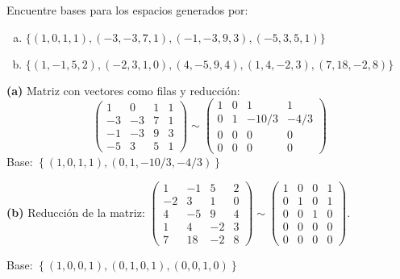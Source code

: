 \begin{prob} Encuentre bases para los espacios generados por:
\begin{enumerate}[(a)]
\item $\{ (1,0,1,1), (-3,-3,7,1), (-1,-3,9,3), (-5,3,5,1) \}$
\item $\{ (1,-1,5,2), (-2,3,1,0), (4,-5,9,4), (1,4,-2,3), (7,18,-2,8) \}$
\end{enumerate}

\begin{myproof}
\textbf{(a)} Matriz con vectores como filas y reducción:
$$\begin{pmatrix} 1 & 0 & 1 & 1 \\ -3 & -3 & 7 & 1 \\ -1 & -3 & 9 & 3 \\ -5 & 3 & 5 & 1 \end{pmatrix} \sim \begin{pmatrix} 1 & 0 & 1 & 1 \\ 0 & 1 & -10/3 & -4/3 \\ 0 & 0 & 0 & 0 \\ 0 & 0 & 0 & 0 \end{pmatrix}$$
Base: $\left\{ (1,0,1,1), (0,1,-10/3,-4/3) \right\}$

\textbf{(b)} Reducción de la matriz: $\begin{pmatrix} 1 & -1 & 5 & 2 \\ -2 & 3 & 1 & 0 \\ 4 & -5 & 9 & 4 \\ 1 & 4 & -2 & 3 \\ 7 & 18 & -2 & 8 \end{pmatrix} \sim \begin{pmatrix} 1 & 0 & 0 & 1 \\ 0 & 1 & 0 & 1 \\ 0 & 0 & 1 & 0 \\ 0 & 0 & 0 & 0 \\ 0 & 0 & 0 & 0 \end{pmatrix}.$


Base: $\left\{ (1,0,0,1), (0,1,0,1), (0,0,1,0) \right\}$
\end{myproof}
\end{prob}

